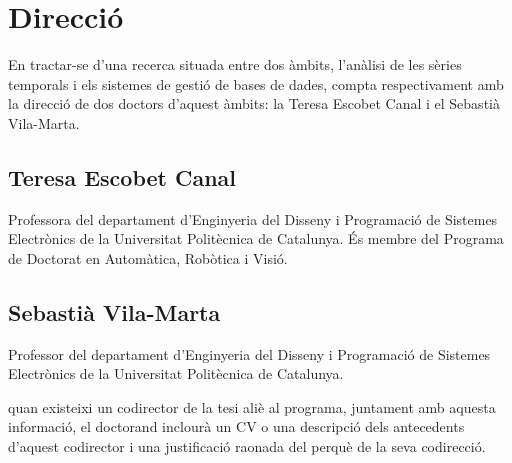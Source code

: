 \chapter{Direcció}


En tractar-se d'una recerca situada entre dos àmbits, l'anàlisi de les
sèries temporals i els sistemes de gestió de bases de dades, compta
respectivament amb la direcció de dos doctors d'aquest àmbits: la
Teresa Escobet Canal i el Sebastià Vila-Marta.

\section{Teresa Escobet Canal}

Professora del departament d'Enginyeria del Disseny i Programació de
Sistemes Electrònics de la Universitat Politècnica de Catalunya. 
És membre del Programa de Doctorat en Automàtica, Robòtica i Visió.



\section{Sebastià Vila-Marta}

Professor del departament d'Enginyeria del Disseny i Programació de
Sistemes Electrònics de la Universitat Politècnica de Catalunya.


quan existeixi un codirector de la tesi aliè al programa, juntament amb aquesta informació, el doctorand inclourà un CV o una descripció dels antecedents d’aquest codirector i una justificació raonada del perquè de la seva codirecció.




